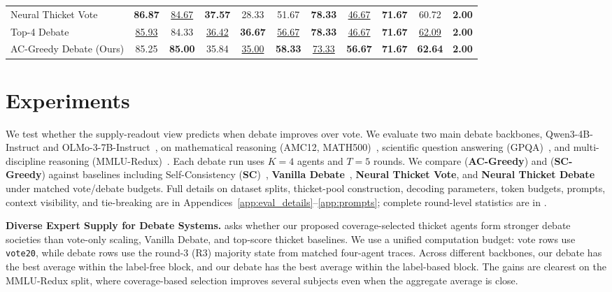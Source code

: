 \begin{table}[t]
{\begin{tabular}{l ccc ccccc cc}
    Neural Thicket Vote
        & \textbf{86.87}
        & \underline{84.67}
        & \textbf{37.57}
        & 28.33
        & 51.67
        & \textbf{78.33}
        & \underline{46.67}
        & \textbf{71.67}
        & 60.72
        & \textbf{2.00} \\
    Top-4 Debate
        & \underline{85.93}
        & 84.33
        & \underline{36.42}
        & \textbf{36.67}
        & \underline{56.67}
        & \textbf{78.33}
        & \underline{46.67}
        & \textbf{71.67}
        & \underline{62.09}
        & \textbf{2.00} \\
    \rowcolor{black!6}
    AC-Greedy Debate (Ours)
        & 85.25
        & \textbf{85.00}
        & 35.84
        & \underline{35.00}
        & \textbf{58.33}
        & \underline{73.33}
        & \textbf{56.67}
        & \textbf{71.67}
        & \textbf{62.64}
        & \textbf{2.00} \\
    \bottomrule
    \end{tabular}
    }
    \vskip -0.2cm
\end{table}

\section{Experiments}
\label{sec:experiments}

We test whether the supply-readout view predicts when debate improves over
vote. We evaluate two main debate backbones, Qwen3-4B-Instruct and
OLMo-3-7B-Instruct~\citep{yang2025qwen3technicalreport, olmo2026olmo3}, on mathematical reasoning (AMC12, MATH500)~\citep{hendrycks2021measuringmathematicalproblemsolving}, scientific
question answering (GPQA)~\citep{rein2024gpqa}, and multi-discipline reasoning (MMLU-Redux)~\citep{hendrycks2021measuring, gema-etal-2025-done}. Each
debate run uses $K=4$ agents and $T=5$ rounds. We compare \acgreedy{} (\textbf{AC-Greedy}) and
\scgreedy{} (\textbf{SC-Greedy}) against baselines including Self-Consistency (\textbf{SC})~\citep{wang2023selfconsistency}, \textbf{Vanilla Debate}~\citep{du2024improving}, \textbf{Neural Thicket Vote}, and
\textbf{Neural Thicket Debate}~\citep{gan2026neuralthicketsdiversetask}
under matched vote/debate budgets. Full details on
dataset splits, thicket-pool construction, decoding parameters, token budgets,
prompts, context visibility, and tie-breaking are in
Appendices~\ref{app:eval_details}--\ref{app:prompts}; complete round-level
statistics are in .

\textbf{Diverse Expert Supply for Debate Systems.}
 asks whether our proposed coverage-selected thicket agents form
stronger debate societies than vote-only scaling, Vanilla Debate, and top-score
thicket baselines. We use a unified computation budget: vote rows use
\texttt{vote20}, while debate rows use the round-3 (R3) majority state from matched
four-agent traces. Across different backbones, our \scgreedy{} debate has the
best average within the label-free block, and our \acgreedy{} debate has the best
average within the label-based block. The gains are clearest on the
MMLU-Redux split, where coverage-based selection improves several subjects even
when the aggregate average is close.

